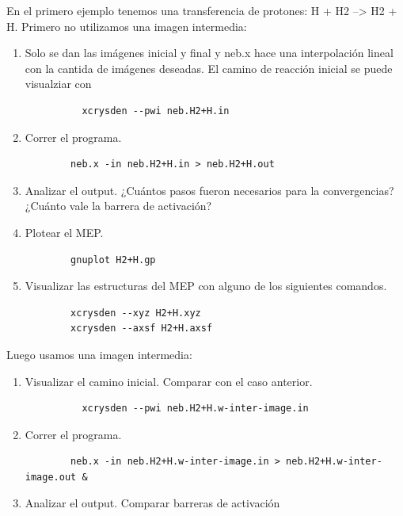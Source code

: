   En el primero ejemplo tenemos una transferencia de protones: H + H2 --> H2 + H. Primero no utilizamos una imagen intermedia:

    \begin{enumerate}
      \item Solo se dan las imágenes inicial y final y neb.x hace una interpolación lineal con la cantida de imágenes deseadas. El camino de reacción inicial se puede visualziar con
        \begin{verbatim}
          xcrysden --pwi neb.H2+H.in
        \end{verbatim}
      \item Correr el programa.
      \begin{verbatim}
        neb.x -in neb.H2+H.in > neb.H2+H.out
      \end{verbatim}
      \item Analizar el output. ¿Cuántos pasos fueron necesarios para la convergencias? ¿Cuánto vale la barrera de activación?
      \item Plotear el MEP.
      \begin{verbatim}
        gnuplot H2+H.gp
      \end{verbatim}
      \item Visualizar las estructuras del MEP con alguno de los siguientes comandos.
      \begin{verbatim}
        xcrysden --xyz H2+H.xyz
        xcrysden --axsf H2+H.axsf
      \end{verbatim}
    \end{enumerate}

  Luego usamos una imagen intermedia:
    \begin{enumerate}
      \item Visualizar el camino inicial. Comparar con el caso anterior.
        \begin{verbatim}
          xcrysden --pwi neb.H2+H.w-inter-image.in
        \end{verbatim}
      \item Correr el programa.
      \begin{verbatim}
        neb.x -in neb.H2+H.w-inter-image.in > neb.H2+H.w-inter-image.out &
      \end{verbatim}
      \item Analizar el output. Comparar barreras de activación
    \end{enumerate}

